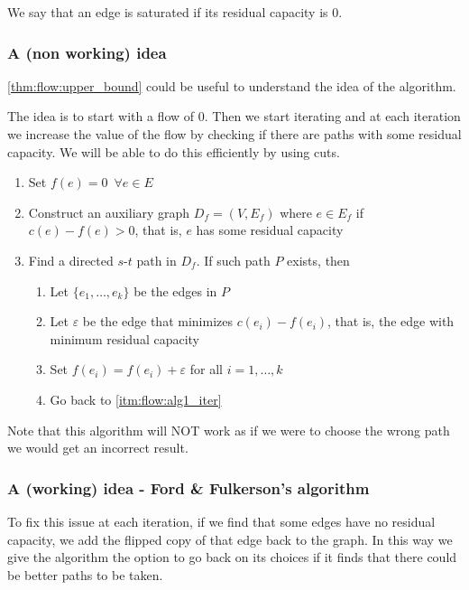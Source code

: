 \documentclass[14pt]{extarticle}
\begin{document}
\begin{definition}
    We say that an edge is saturated if its residual capacity is $0$.
\end{definition}

\subsubsection{A (non working) idea}

\autoref{thm:flow:upper_bound} could be useful to understand the idea of the algorithm.

The idea is to start with a flow of $0$. Then we start iterating and at each iteration we increase the value of the flow by checking if there are paths with some residual capacity.
We will be able to do this efficiently by using cuts.

\begin{enumerate}
    \item Set $f(e) = 0 \enspace \forall e \in E$
    \item \label{itm:flow:alg1_iter} Construct an auxiliary graph $D_f = (V, E_f)$ where $e \in E_f$ if $c(e) - f(e) > 0$, that is, $e$ has some residual capacity
    \item Find a directed $s$-$t$ path in $D_f$. If such path $P$ exists, then
          \begin{enumerate}[label*=\arabic*.]
              \item Let $\{e_1, \ldots, e_k\}$ be the edges in $P$
              \item Let $\varepsilon$ be the edge that minimizes $c(e_i) - f(e_i)$, that is, the edge with minimum residual capacity
              \item Set $f(e_i) = f(e_i) + \varepsilon$ for all $i = 1, \ldots, k$
              \item Go back to \autoref{itm:flow:alg1_iter}
          \end{enumerate}
\end{enumerate}

Note that this algorithm will NOT work as if we were to choose the wrong path we would get an incorrect result.


\subsubsection{A (working) idea - Ford \& Fulkerson's algorithm}

To fix this issue at each iteration, if we find that some edges have no residual capacity, we add the flipped copy of that edge back to the graph.
In this way we give the algorithm the option to go back on its choices if it finds that there could be better paths to be taken.
\end{document}
